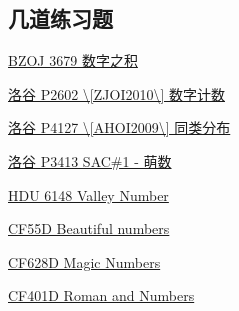 \subsection{几道练习题}

\href{https://www.lydsy.com/JudgeOnline/problem.php?id=3679}{BZOJ 3679 数字之积 }

\href{https://www.luogu.org/problemnew/show/P2602}{洛谷 P2602 \textbackslash{}[ZJOI2010\textbackslash{}] 数字计数 }

\href{https://www.luogu.org/problemnew/show/P4127}{洛谷 P4127 \textbackslash{}[AHOI2009\textbackslash{}] 同类分布 }

\href{https://www.luogu.org/problemnew/show/P3413}{洛谷  P3413 SAC\#1 - 萌数}

\href{http://acm.hdu.edu.cn/showproblem.php?pid=6148}{HDU 6148 Valley Number }

\href{http://codeforces.com/problemset/problem/55/D}{CF55D Beautiful numbers}

\href{http://codeforces.com/problemset/problem/628/D}{CF628D Magic Numbers}

\href{http://codeforces.com/problemset/problem/401/D}{CF401D Roman and Numbers}
